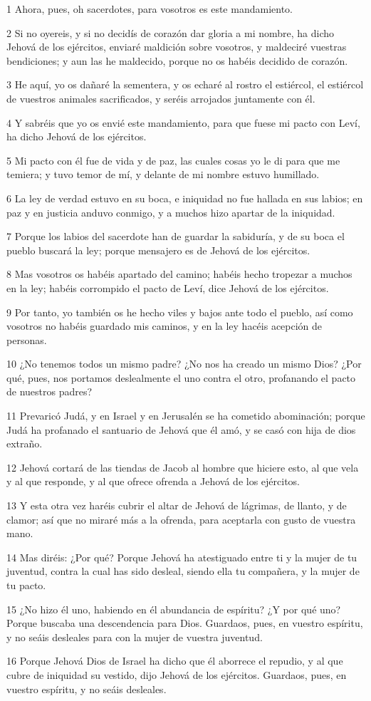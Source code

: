 \par 1 Ahora, pues, oh sacerdotes, para vosotros es este mandamiento.
\par 2 Si no oyereis, y si no decidís de corazón dar gloria a mi nombre, ha dicho Jehová de los ejércitos, enviaré maldición sobre vosotros, y maldeciré vuestras bendiciones; y aun las he maldecido, porque no os habéis decidido de corazón.
\par 3 He aquí, yo os dañaré la sementera, y os echaré al rostro el estiércol, el estiércol de vuestros animales sacrificados, y seréis arrojados juntamente con él.
\par 4 Y sabréis que yo os envié este mandamiento, para que fuese mi pacto con Leví, ha dicho Jehová de los ejércitos.
\par 5 Mi pacto con él fue de vida y de paz, las cuales cosas yo le di para que me temiera; y tuvo temor de mí, y delante de mi nombre estuvo humillado.
\par 6 La ley de verdad estuvo en su boca, e iniquidad no fue hallada en sus labios; en paz y en justicia anduvo conmigo, y a muchos hizo apartar de la iniquidad.
\par 7 Porque los labios del sacerdote han de guardar la sabiduría, y de su boca el pueblo buscará la ley; porque mensajero es de Jehová de los ejércitos.
\par 8 Mas vosotros os habéis apartado del camino; habéis hecho tropezar a muchos en la ley; habéis corrompido el pacto de Leví, dice Jehová de los ejércitos.
\par 9 Por tanto, yo también os he hecho viles y bajos ante todo el pueblo, así como vosotros no habéis guardado mis caminos, y en la ley hacéis acepción de personas. 
\par 10 ¿No tenemos todos un mismo padre? ¿No nos ha creado un mismo Dios? ¿Por qué, pues, nos portamos deslealmente el uno contra el otro, profanando el pacto de nuestros padres?
\par 11 Prevaricó Judá, y en Israel y en Jerusalén se ha cometido abominación; porque Judá ha profanado el santuario de Jehová que él amó, y se casó con hija de dios extraño.
\par 12 Jehová cortará de las tiendas de Jacob al hombre que hiciere esto, al que vela y al que responde, y al que ofrece ofrenda a Jehová de los ejércitos.
\par 13 Y esta otra vez haréis cubrir el altar de Jehová de lágrimas, de llanto, y de clamor; así que no miraré más a la ofrenda, para aceptarla con gusto de vuestra mano.
\par 14 Mas diréis: ¿Por qué? Porque Jehová ha atestiguado entre ti y la mujer de tu juventud, contra la cual has sido desleal, siendo ella tu compañera, y la mujer de tu pacto.
\par 15 ¿No hizo él uno, habiendo en él abundancia de espíritu? ¿Y por qué uno? Porque buscaba una descendencia para Dios. Guardaos, pues, en vuestro espíritu, y no seáis desleales para con la mujer de vuestra juventud.
\par 16 Porque Jehová Dios de Israel ha dicho que él aborrece el repudio, y al que cubre de iniquidad su vestido, dijo Jehová de los ejércitos. Guardaos, pues, en vuestro espíritu, y no seáis desleales.

